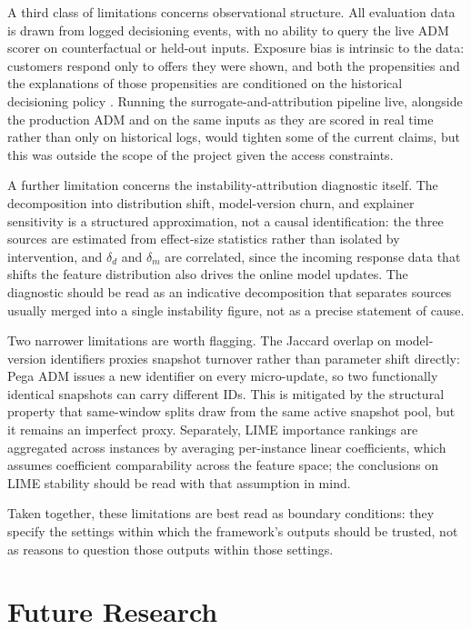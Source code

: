 \documentclass[oneside]{memoir} %
\begin{document}
A third class of limitations concerns observational structure. All evaluation data is drawn from logged decisioning events, with no ability to query the live ADM scorer on counterfactual or held-out inputs. Exposure bias is intrinsic to the data: customers respond only to offers they were shown, and both the propensities and the explanations of those propensities are conditioned on the historical decisioning policy \parencite{lundberg_be_2018, schnabel_recommendations_2016}. Running the surrogate-and-attribution pipeline live, alongside the production ADM and on the same inputs as they are scored in real time rather than only on historical logs, would tighten some of the current claims, but this was outside the scope of the project given the access constraints.

A further limitation concerns the instability-attribution diagnostic itself. The decomposition into distribution shift, model-version churn, and explainer sensitivity is a structured approximation, not a causal identification: the three sources are estimated from effect-size statistics rather than isolated by intervention, and $\delta_d$ and $\delta_m$ are correlated, since the incoming response data that shifts the feature distribution also drives the online model updates. The diagnostic should be read as an indicative decomposition that separates sources usually merged into a single instability figure, not as a precise statement of cause.

Two narrower limitations are worth flagging. The Jaccard overlap on model-version identifiers proxies snapshot turnover rather than parameter shift directly: Pega ADM issues a new identifier on every micro-update, so two functionally identical snapshots can carry different IDs. This is mitigated by the structural property that same-window splits draw from the same active snapshot pool, but it remains an imperfect proxy. Separately, LIME importance rankings are aggregated across instances by averaging per-instance linear coefficients, which assumes coefficient comparability across the feature space; the conclusions on LIME stability should be read with that assumption in mind.

Taken together, these limitations are best read as boundary conditions: they specify the settings within which the framework's outputs should be trusted, not as reasons to question those outputs within those settings.

\section{Future Research}
\end{document}
